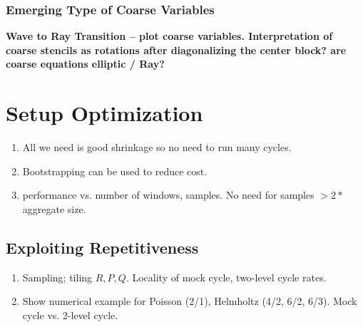 \documentclass{article}
\begin{document}
\label{sec:multilevel}

\subsubsection{Emerging Type of Coarse Variables}
{\bf Wave to Ray Transition -- plot coarse variables. Interpretation of coarse stencils as rotations after diagonalizing the center block? are coarse equations elliptic / Ray?
}

\section{Setup Optimization}
\label{sec:reduce_cost}

{\bf
\begin{enumerate}
\item All we need is good shrinkage so no need to run many cycles.
\item Bootstrapping can be used to reduce cost.
\item performance vs. number of windows, samples. No need for samples $> 2 *$ aggregate size.
\end{enumerate}
}

\subsection{Exploiting Repetitiveness}
\label{sec:repetitive}
{\bf
\begin{enumerate}
\item Sampling; tiling $R,P,Q$. Locality of mock cycle, two-level cycle rates.
\item Show numerical example for Poisson (2/1), Helmholtz (4/2, 6/2, 6/3). Mock cycle vs. 2-level cycle.
\end{enumerate}
}
\end{document}
